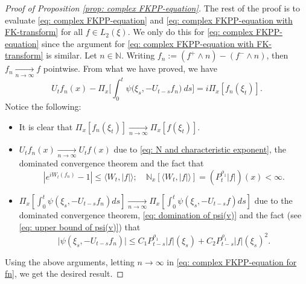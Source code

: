 \documentclass[12pt,a4paper]{amsart}
\theoremstyle{plain}
\theoremstyle{definition}
\numberwithin{equation}{section}
\begin{document}
\begin{proof}[Proof of Proposition \ref{prop: complex FKPP-equation}]
    The rest of the proof is to evaluate \eqref{eq: complex FKPP-equation} and \eqref{eq: complex FKPP-equation with FK-transform} for all $f\in L_2(\xi)$. We only do this for \eqref{eq: complex FKPP-equation} since the argument for \eqref{eq: complex FKPP-equation with FK-transform} is similar.
    Let $n \in \mathbb N$.
    Writing $f_n := (f^+ \wedge n) - (f^- \wedge n)$, then $f_n \xrightarrow[n\to \infty]{} f$ pointwise.
    From what we have proved, we have
\begin{equation}
\label{eq: complex FKPP-equation for fn}
    U_tf_n(x) - \Pi_{x} \Big[\int_0^t \psi\big(\xi_s, - U_{t-s}f_n\big) ~ds\Big]
    = i \Pi_{x} [f_n(\xi_t)].
\end{equation}
    Notice the following:
\begin{itemize}
\item
    It is clear that $\Pi_{x}[f_n(\xi_t)] \xrightarrow[n\to \infty]{} \Pi_{x}[f(\xi_t)]$.
\item
    $U_tf_n(x) \xrightarrow[n\to \infty]{} U_tf(x)$ due to \eqref{eq: N and characteristic exponent}, the dominated convergence theorem and the fact that
\[
    |e^{i W_t(f_n)} - 1| \leq \langle W_t, |f|\rangle;
    \quad \mathbb N_x[\langle W_t, |f|\rangle] = (P_t^{\rho_1} |f|)(x) < \infty.
\]
\item
    $\Pi_{x} [\int_0^t \psi(\xi_s,- U_{t-s}f_n)ds] \xrightarrow[n\to \infty]{} \Pi_{x} [\int_0^t \psi(\xi_s,- U_{t-s}f)ds]$ due to the dominated convergence theorem, \eqref{eq: domination of psi(v)} and the fact (see \eqref{eq: upper bound of psi(v)}) that
\begin{equation}
    \big|\psi(\xi_s,- U_{t-s}f_n)\big|
    \leq C_1 P_{t-s}^{\rho_1}|f|(\xi_s)+C_2 P_{t-s}^{\rho_1}|f|(\xi_s)^2.
\end{equation}
\end{itemize}
    Using the above arguments, letting $n \to \infty$ in \eqref{eq: complex FKPP-equation for fn}, we get the desired result.
\end{proof}
\end{document}
